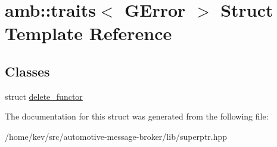 \hypertarget{structamb_1_1traits_3_01GError_01_4}{\section{amb\+:\+:traits$<$ G\+Error $>$ Struct Template Reference}
\label{structamb_1_1traits_3_01GError_01_4}
}
\subsection*{Classes}
\begin{DoxyCompactItemize}
\item 
struct \hyperlink{structamb_1_1traits_3_01GError_01_4_1_1delete__functor}{delete\+\_\+functor}
\end{DoxyCompactItemize}


The documentation for this struct was generated from the following file\+:\begin{DoxyCompactItemize}
\item 
/home/kev/src/automotive-\/message-\/broker/lib/superptr.\+hpp\end{DoxyCompactItemize}
